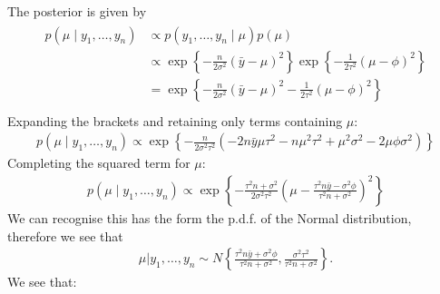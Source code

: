 \documentclass[letterpaper,10pt,english]{jupyterBook}
\begin{document}
\sphinxAtStartPar
The posterior is given by
\begin{equation*}
\begin{split}
\begin{align*}
p(\mu \mid y_1,\dots,y_n) 
&\propto p(y_1,\dots,y_n \mid \mu) p(\mu) \\
&\propto \exp\left\{ -\frac{n}{2\sigma^2} (\bar y - \mu)^2 \right\}
\exp\left\{-\frac{1}{2\tau^2}(\mu-\phi)^2\right\} \\ 
 & = \exp\left\{ -\frac{n}{2\sigma^2}(\bar{y}-\mu)^2
-\frac{1}{2\tau^2}(\mu-\phi)^2\right\} \\
\end{align*}
\end{split}
\end{equation*}
\sphinxAtStartPar
Expanding the brackets and retaining only terms containing \(\mu\):
\begin{equation*}
\begin{split}
p(\mu \mid y_1,\dots,y_n) 
 \propto \exp\left\{ -\frac{n}{2\sigma^2 \tau^2}  (-2n\bar{y}\mu\tau^2 - n\mu^2\tau^2+\mu^2\sigma^2-2\mu\phi\sigma^2)
\right\} 
\end{split}
\end{equation*}
\sphinxAtStartPar
Completing the squared term for \(\mu\):
\begin{equation*}
\begin{split}
p(\mu \mid y_1,\dots,y_n) 
\propto \exp\left\{ -\frac{\tau^2 n + \sigma^2}{2 \sigma^2 \tau^2}\left(\mu - \frac{ \tau^2 n\bar{y} -\sigma^2\phi}{\tau^2n+\sigma^2}\right)^2\right\}
\end{split}
\end{equation*}
\sphinxAtStartPar
We can recognise this has the form the p.d.f. of the Normal distribution, therefore we see that
\begin{equation*}
\begin{split}
\mu \vert y_1,\dots,y_n \sim N\left\{ \frac{ \tau^2 n\bar{y} + \sigma^2\phi }{\tau^2 n + \sigma^2}, \frac{\sigma^2\tau^2}{\tau^2n+\sigma^2} \right\}.
\end{split}
\end{equation*}
\sphinxAtStartPar
We see that:
\end{document}
